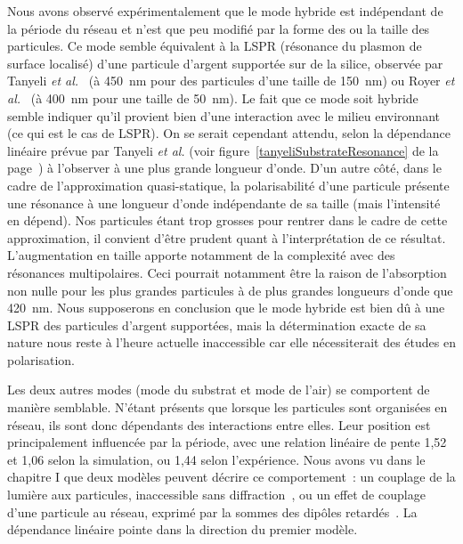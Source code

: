 Nous avons observé expérimentalement que le mode hybride est indépendant de la période du réseau et n'est que peu modifié par la forme des ou la taille des particules. Ce mode semble équivalent à la LSPR (résonance du plasmon de surface localisé) d'une particule d'argent supportée sur de la silice, observée par Tanyeli \textit{et al.}~\cite{tanyeli2013effect} (à 450~nm pour des particules d'une taille de 150~nm) ou Royer \textit{et al.}~\cite{royer1987substrate} (à 400~nm pour une taille de 50~nm). Le fait que ce mode soit hybride semble indiquer qu'il provient bien d'une interaction avec le milieu environnant (ce qui est le cas de LSPR). On se serait cependant attendu, selon la dépendance linéaire prévue par Tanyeli \textit{et al.} (voir figure~\ref{tanyeliSubstrateResonance} de la page~\pageref{tanyeliSubstrateResonance}) à l'observer à une plus grande longueur d'onde. D'un autre côté, dans le cadre de l'approximation quasi-statique, la polarisabilité d'une particule présente une résonance à une longueur d'onde indépendante de sa taille (mais l'intensité en dépend). Nos particules étant trop grosses pour rentrer dans le cadre de cette approximation, il convient d'être prudent quant à l'interprétation de ce résultat. L'augmentation en taille apporte notamment de la complexité avec des résonances multipolaires. Ceci pourrait notamment être la raison de l'absorption non nulle pour les plus grandes particules à de plus grandes longueurs d'onde que 420~nm. Nous supposerons en conclusion que le mode hybride est bien dû à une LSPR des particules d'argent supportées, mais la détermination exacte de sa nature nous reste à l'heure actuelle inaccessible car elle nécessiterait des études en polarisation.\par 
Les deux autres modes (mode du substrat et mode de l'air) se comportent de manière semblable. N'étant présents que lorsque les particules sont organisées en réseau, ils sont donc dépendants des interactions entre elles. Leur position est principalement influencée par la période, avec une relation linéaire de pente 1,52 et 1,06 selon la simulation, ou 1,44 selon l'expérience. 
Nous avons vu dans le chapitre I que deux modèles peuvent décrire ce comportement~: un couplage de la lumière aux particules, inaccessible sans diffraction~\cite{kravets2008extremely}, ou un effet de couplage d’une particule au réseau, exprimé par la sommes des dipôles retardés~\cite{zou2004narrow}. La dépendance linéaire pointe dans la direction du premier modèle.\par 
